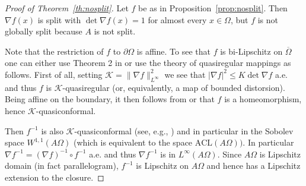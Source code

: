 \documentclass[titlepage]{amsart}
\numberwithin{equation}{section}
\theoremstyle{plain}
\theoremstyle{definition}
\theoremstyle{remark}
\newcommand{\Lip}{\operatorname{Lip}}
\newcommand{\red}[1]{{\color{red}{#1}}}
\newcommand{\green}[1]{{\color{ForestGreen}{#1}}}
\newcommand{\g}{\nabla }
\begin{document}
\begin{proof}[Proof of Theorem~\ref{th:nosplit}]
Let $f$ be as in Proposition~\ref{prop:nosplit}.
Then $\g f(x)$ is split with $\det \g f(x) = 1$ for almost every $x\in\Omega$, but $f$ is not globally split because $A$ is not split. 

Note that  the restriction of $f$ to $\partial \Omega$ is affine.  To see that $f$ is bi-Lipschitz on $\overline \Omega$ one
can either use Theorem 2 in \cite{ball_invertibility81} or use the theory of quasiregular mappings \cite{ahlfors66} as follows. First of all, setting $\mathcal{K}= \| \g f\|_{L^\infty}^2$ we see that $|\g f|^2 \le K \det \g f$
a.e. and thus $f$ is $\mathcal{K}$-quasiregular (or, equivalently, a map of bounded distorsion). Being affine on the boundary, it then follows from \cite[Theorem 5]{LeonettiNesi} or \cite[Theorem 6.1]{BojarskiDOnofrioetal}
that $f$ is a homeomorphism, hence $\mathcal{K}$-quasiconformal. 

Then $f^{-1}$ is also $\mathcal{K}$-quasiconformal
(see, e.g., \cite[Chapter 2]{ahlfors66}) 
and in particular in the Sobolev space $W^{1,1}(A \Omega)$ (which is equivalent to the space $\mathrm{ACL}(A\Omega))$.
In particular $\g f^{-1} = (\g f)^{-1} \circ f^{-1}$ a.e. and thus $\g f^{-1}$ is in $L^\infty(A\Omega)$. Since $A \Omega$ is Lipschitz domain
(in fact parallelogram),  $f^{-1}$ is Lipschitz on $A\Omega$ and hence has a Lipschitz extension to the closure.
%
%
\end{proof}
\end{document}
